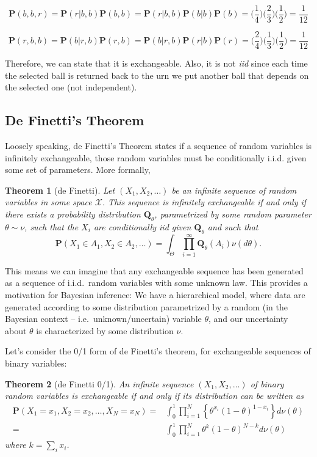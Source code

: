 \documentclass[twoside]{article}
\newcounter{lecnum}
\newtheorem{theorem}{Theorem}[lecnum]
\newcommand\Prob{\mathbf{P}}
\newcommand\Q{\mathbf{Q}}
\begin{document}
$$\Prob(b,b,r)=\Prob(r|b,b)\Prob(b,b)=\Prob(r|b,b)\Prob(b|b)\Prob(b) = \Big( \frac{1}{4} \Big)  \Big( \frac{2}{3}\Big)  \Big(\frac{1}{2}\Big) = \frac{1}{12}$$

$$\Prob(r,b,b)=\Prob(b|r,b)\Prob(r,b)=\Prob(b|r,b)\Prob(r|b)\Prob(r) = \Big( \frac{2}{4} \Big)  \Big( \frac{1}{3}\Big)  \Big(\frac{1}{2}\Big) = \frac{1}{12}$$

Therefore, we can state that it is exchangeable. Also, it is not \textit{iid} since each time the selected ball is returned back to the urn we put another ball that depends on the selected one (not independent). 

\color{black}
\newpage

\subsection{De Finetti's Theorem}

Loosely speaking, de Finetti's Theorem states if a sequence of random variables is infinitely exchangeable, those random variables must be conditionally i.i.d. given some set of parameters. More formally,

\begin{theorem}[de Finetti]
  Let $(X_1,X_2,\dots)$ be an infinite sequence of random variables in some space $\mathcal{X}$. This sequence is infinitely exchangeable if and only if there exists a probability distribution $\Q_\theta$, parametrized by some random parameter $\theta\sim \nu$, such that the $X_i$ are conditionally iid given $\Q_\theta$ and such that
$$\Prob(X_1\in A_1,X_2\in A_2,\dots) = \int_{\Theta}\prod_{i=1}^\infty \Q_\theta(A_i) \nu(d\theta).$$
\end{theorem}

This means we can imagine that any exchangeable sequence has been generated as a sequence of i.i.d.\ random variables with some unknown law. This provides a motivation for Bayesian inference: We have a hierarchical model, where data are generated according to some distribution parametrized by a random (in the Bayesian context -- i.e.\ unknown/uncertain) variable $\theta$, and our uncertainty about $\theta$ is characterized by some distribution $\nu$.

Let's consider the 0/1 form of de Finetti's theorem, for exchangeable sequences of binary variables:


\begin{theorem}[de Finetti 0/1]
  An infinite sequence $(X_1,X_2,\dots)$ of binary random variables is exchangeable if and only if its distribution can be written as
  $$\begin{aligned}\Prob(X_1=x_1,X_2=x_2,\dots, X_N=x_N)  =& \int_0^1\prod_{i=1}^N\left\{\theta^{x_i}(1-\theta)^{1-x_i}\right\} d\nu(\theta)\\
    =&\int_0^1\prod_{i=1}^N\theta^{k}(1-\theta)^{N-k} d\nu(\theta)\end{aligned}$$
  where $k=\sum_ix_i$.
\end{theorem}
\end{document}
